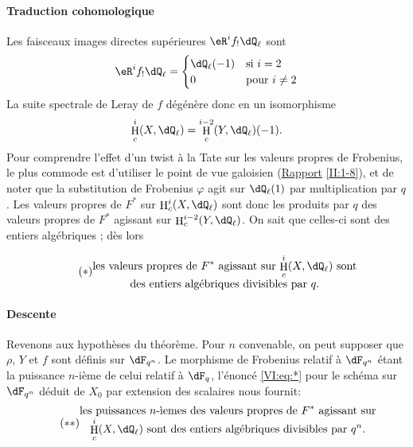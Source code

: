 \documentclass[oneside]{book}
\DeclareMathOperator{\h}{H}
\theoremstyle{sga-source}
\theoremstyle{sga-source-dash}
\theoremstyle{sga-source-dotdash}
\theoremstyle{sga-source-number-note-dash}
\theoremstyle{sga-source-note-number-dotdash}
\theoremstyle{sga-source-example-dotdash}
\theoremstyle{sga-source-inline-number}
\theoremstyle{sga-source-bare-number}
\theoremstyle{sga-source}
\begin{document}
\paragraph{Traduction cohomologique}
Les faisceaux images directes supérieures $\eR^i f_!\dQ_\ell$ sont 
\[
  \eR^i f_!\dQ_\ell = \begin{cases}
                       \dQ_\ell(-1) & \text{si $i = 2$} \\
                       0            & \text{pour $i\ne 2$}
                     \end{cases}
\]
La suite spectrale de Leray de $f$ dégénère donc en un isomorphisme 
\[
  \h_c^i(X,\dQ_\ell) = \h_c^{i-2}(Y,\dQ_\ell)(-1) \text{.}
\]
Pour comprendre l'effet d'un twist à la Tate sur les valeurs propres de 
Frobenius, le plus commode est d'utiliser le point de vue galoisien 
(\hyperref[II]{Rapport} \ref{II:1-8}), et de noter que la substitution de 
Frobenius $\varphi$ agit sur $\dQ_\ell(1)$ par multiplication par $q$. Les 
valeurs propres de $F^\ast$ sur $\var{\h_c^p(X,\dQ_\ell)}{\h_c^i(X,\dQ_\ell)}{S45-SOL-0696}$ sont donc les produits par 
$q$ des valeurs propres de $F^\ast$ agissant sur $\h_c^{i-2}(Y,\dQ_\ell)$. On 
sait que celles-ci sont des entiers algébriques \cite[XXI 5.2.2]{sga7}; dès 
lors 

\begin{equation*}\tag{$*$}\label{VI:eq:*}
  \substack{\displaystyle\text{les valeurs propres de $F^\ast$ agissant sur $\h_c^i(X,\dQ_\ell)$ sont} \\
  \displaystyle\text{des entiers algébriques divisibles par $q$.}}
\end{equation*}


\paragraph{Descente}
Revenons aux hypothèses du théorème. Pour $n$ convenable, on peut 
supposer que $\rho$, $Y$ et $f$ sont définis sur $\dF_{q^n}$. Le morphisme de 
Frobenius relatif à $\dF_{q^n}$ étant la puissance $n$-ième de celui 
relatif à $\dF_q$, l'énoncé \eqref{VI:eq:*} pour le schéma sur 
$\dF_{q^n}$ déduit de $X_0$ par extension des scalaires nous fournit: 
\begin{equation*}\tag{$**$}\label{VI:eq:**}
  \substack{\displaystyle\text{les puissances $n$-\`iemes des valeurs propres de $F^\ast$ agissant sur} \\ \displaystyle\text{$\h_c^i(X,\dQ_\ell)$ sont des entiers algébriques divisibles par $q^n$.}}
\end{equation*}
\end{document}
